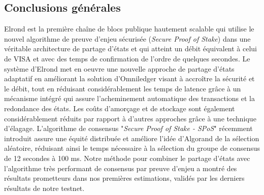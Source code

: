 \documentclass[journal]{IEEEtran}
\begin{document}
\subsection{Conclusions générales}
Elrond est la première chaîne de blocs publique hautement scalable qui utilise le nouvel algorithme de preuve d'enjeu sécurisée (\textit{Secure Proof of Stake}) dans une véritable architecture de partage  d'états et qui atteint un débit équivalent à celui de  VISA et avec des temps de confirmation de l'ordre de quelques secondes. Le système d'Elrond met en oeuvre une nouvelle approche de partage d'états adaptatif en améliorant la solution d'Omniledger visant à accroître la sécurité et le débit, tout en réduisant considérablement les temps de latence grâce à un mécanisme  intégré qui assure l'acheminement automatique des transactions et la redondance des états. Les coûts d'amorçage et de stockage sont également considérablement réduits par rapport à d'autres approches grâce à une technique d'élagage. L'algorithme de consensus "\textit{Secure Proof of Stake - SPoS}" récemment introduit assure une équité distribuée et améliore l'idée d'Algorand de la sélection aléatoire, réduisant ainsi le temps nécessaire à la sélection du groupe de consensus de 12 secondes à 100 ms. Notre méthode pour combiner le partage  d'états avec l'algorithme très performant de consensus par preuve d'enjeu a montré des résultats prometteurs dans nos premières estimations, validés par  les derniers résultats de notre testnet.





   
    





\end{document}
